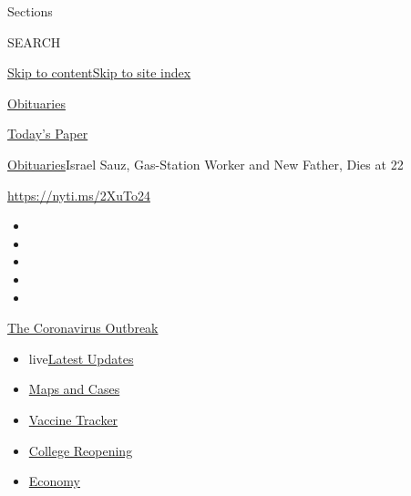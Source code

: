 Sections

SEARCH

\protect\hyperlink{site-content}{Skip to
content}\protect\hyperlink{site-index}{Skip to site index}

\href{https://www.nytimes.com/section/obituaries}{Obituaries}

\href{https://myaccount.nytimes.com/auth/login?response_type=cookie\&client_id=vi}{}

\href{https://www.nytimes.com/section/todayspaper}{Today's Paper}

\href{/section/obituaries}{Obituaries}\textbar{}Israel Sauz, Gas-Station
Worker and New Father, Dies at 22

\url{https://nyti.ms/2XuTo24}

\begin{itemize}
\item
\item
\item
\item
\item
\end{itemize}

\href{https://www.nytimes.com/news-event/coronavirus?action=click\&pgtype=Article\&state=default\&region=TOP_BANNER\&context=storylines_menu}{The
Coronavirus Outbreak}

\begin{itemize}
\tightlist
\item
  live\href{https://www.nytimes.com/2020/08/03/world/coronavirus-covid-19.html?action=click\&pgtype=Article\&state=default\&region=TOP_BANNER\&context=storylines_menu}{Latest
  Updates}
\item
  \href{https://www.nytimes.com/interactive/2020/us/coronavirus-us-cases.html?action=click\&pgtype=Article\&state=default\&region=TOP_BANNER\&context=storylines_menu}{Maps
  and Cases}
\item
  \href{https://www.nytimes.com/interactive/2020/science/coronavirus-vaccine-tracker.html?action=click\&pgtype=Article\&state=default\&region=TOP_BANNER\&context=storylines_menu}{Vaccine
  Tracker}
\item
  \href{https://www.nytimes.com/2020/08/02/us/covid-college-reopening.html?action=click\&pgtype=Article\&state=default\&region=TOP_BANNER\&context=storylines_menu}{College
  Reopening}
\item
  \href{https://www.nytimes.com/live/2020/08/03/business/stock-market-today-coronavirus?action=click\&pgtype=Article\&state=default\&region=TOP_BANNER\&context=storylines_menu}{Economy}
\end{itemize}

